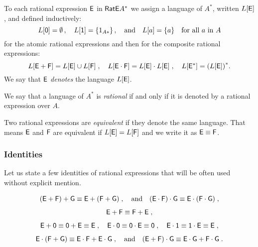 \begin{defn}
    To each rational expression ${\mathsf{E}}$ in ${\mathsf{RatE}} A^*$ we assign a language of $A^*$, written $L[{\mathsf{E}}]$, and defined inductively:
    \[
            L[{\mathsf{0}}] = \emptyset \, , \quad L[{\mathsf{1}}] = \{1_{A*}\} \, , \quad \text{and} \quad L[a] = \{a\} \quad \text{for all $a$ in $A$}
    \]
    for the atomic rational expressions and then for the composite rational expressions:
    \[
        L[{\mathsf{E}} + {\mathsf{F}}] = L[{\mathsf{E}}] \cup L[{\mathsf{F}}] \; , \quad L[{\mathsf{E}} \cdot {\mathsf{F}}] = L[{\mathsf{E}}] \cdot L[{\mathsf{E}}] \; , \quad L[{\mathsf{E}}^*] = {(L[{\mathsf{E}}])}^*.
    \]
    We say that ${\mathsf{E}}$ \emph{denotes} the language $L[{\mathsf{E}}]$.
\end{defn}

We say that a language of $A^*$ is \emph{rational} if and only if it is denoted by a rational expression over $A$.

Two rational expressions are \emph{equivalent} if they denote the same language. That means ${\mathsf{E}}$ and ${\mathsf{F}}$ are equivalent if $L[{\mathsf{E}}] = L[{\mathsf{F}}]$ and we write it as ${\mathsf{E}} \equiv {\mathsf{F}}$.

\subsubsection*{Identities}

Let us state a few identities of rational expressions that will be often used without explicit mention.

\begin{lemma}\label{lm:expression_identities}
    \begin{gather*}
        ({\mathsf{E}} + {\mathsf{F}}) + {\mathsf{G}} \equiv {\mathsf{E}} + ({\mathsf{F}} + {\mathsf{G}}) \; , \quad \text{and} \quad ({\mathsf{E}} \cdot {\mathsf{F}}) \cdot {\mathsf{G}} \equiv {\mathsf{E}} \cdot ({\mathsf{F}} \cdot {\mathsf{G}}) \; ,\\[1ex]
        {\mathsf{E}} + {\mathsf{F}} \equiv {\mathsf{F}} + {\mathsf{E}} \; ,\\[1ex]
        {\mathsf{E}} + {\mathsf{0}} \equiv {\mathsf{0}} + {\mathsf{E}} \equiv {\mathsf{E}} \; , \quad {\mathsf{E}} \cdot {\mathsf{0}} \equiv {\mathsf{0}} \cdot {\mathsf{E}} \equiv {\mathsf{0}} \; , \quad {\mathsf{E}} \cdot {\mathsf{1}} \equiv {\mathsf{1}} \cdot {\mathsf{E}} \equiv {\mathsf{E}} \; ,\\[1ex]
        {\mathsf{E}} \cdot ({\mathsf{F}} + {\mathsf{G}}) \equiv {\mathsf{E}} \cdot {\mathsf{F}} + {\mathsf{E}} \cdot {\mathsf{G}} \; , \quad \text{and} \quad ({\mathsf{E}} + {\mathsf{F}}) \cdot {\mathsf{G}} \equiv {\mathsf{E}} \cdot {\mathsf{G}} + {\mathsf{F}} \cdot {\mathsf{G}} \; .
    \end{gather*}
\end{lemma}

